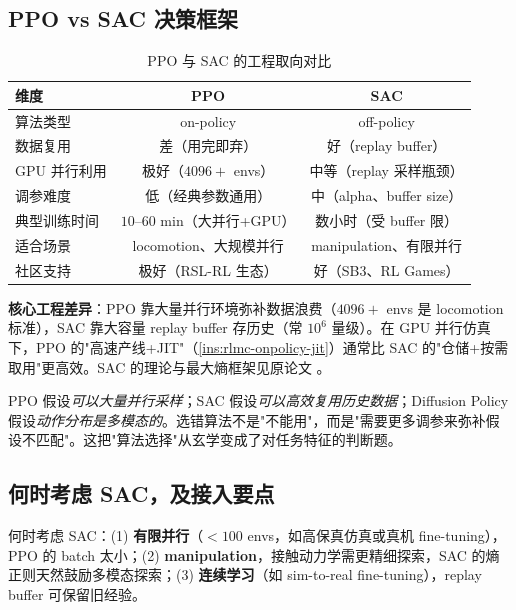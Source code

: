 \subsection{PPO vs SAC 决策框架}

\begin{table}[H]
\centering
\caption{PPO 与 SAC 的工程取向对比}
\label{tab:rlmc-ppo-sac}
\begin{tabular}{lcc}
\hline
维度 & PPO & SAC \\
\hline
算法类型 & on-policy & off-policy \\
数据复用 & 差（用完即弃） & 好（replay buffer） \\
GPU 并行利用 & 极好（$4096+$ envs） & 中等（replay 采样瓶颈） \\
调参难度 & 低（经典参数通用） & 中（alpha、buffer size） \\
典型训练时间 & $10$--$60$ min（大并行+GPU） & 数小时（受 buffer 限） \\
适合场景 & locomotion、大规模并行 & manipulation、有限并行 \\
社区支持 & 极好（RSL-RL 生态） & 好（SB3、RL Games） \\
\hline
\end{tabular}
\end{table}

\textbf{核心工程差异}：PPO 靠大量并行环境弥补数据浪费（$4096+$ envs 是 locomotion 标准），SAC 靠大容量 replay buffer 存历史（常 $10^6$ 量级）。在 GPU 并行仿真下，PPO 的"高速产线+JIT"（\cref{ins:rlmc-onpolicy-jit}）通常比 SAC 的"仓储+按需取用"更高效。SAC 的理论与最大熵框架见原论文 \cite{haarnoja2018sac}。

\begin{insight}\label{ins:rlmc-algo-match}
PPO 假设\emph{可以大量并行采样}；SAC 假设\emph{可以高效复用历史数据}；Diffusion Policy 假设\emph{动作分布是多模态的}。选错算法不是"不能用"，而是"需要更多调参来弥补假设不匹配"。这把"算法选择"从玄学变成了对任务特征的判断题。
\end{insight}

\subsection{何时考虑 SAC，及接入要点}

何时考虑 SAC：(1) \textbf{有限并行}（$<100$ envs，如高保真仿真或真机 fine-tuning），PPO 的 batch 太小；(2) \textbf{manipulation}，接触动力学需更精细探索，SAC 的熵正则天然鼓励多模态探索；(3) \textbf{连续学习}（如 sim-to-real fine-tuning），replay buffer 可保留旧经验。

